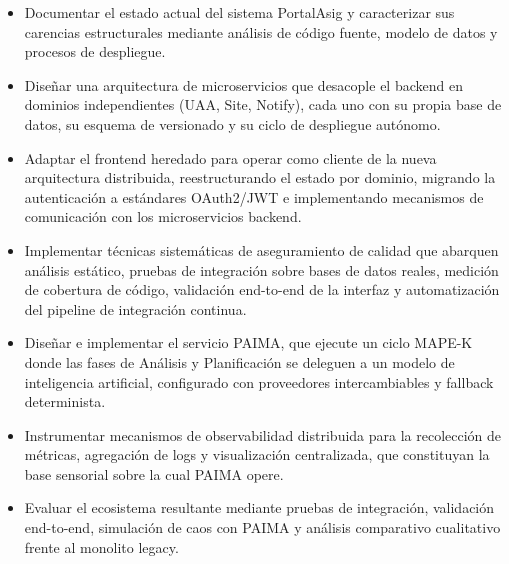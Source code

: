 \begin{itemize}
    \item Documentar el estado actual del sistema PortalAsig y caracterizar sus
carencias estructurales mediante an\'{a}lisis de c\'{o}digo fuente, modelo de datos y
procesos de despliegue.
    \item Dise\~{n}ar una arquitectura de microservicios que desacople el backend en
dominios independientes (UAA, Site, Notify), cada uno con su propia base de datos,
su esquema de versionado y su ciclo de despliegue aut\'{o}nomo.
    \item Adaptar el frontend heredado para operar como cliente de la nueva
arquitectura distribuida, reestructurando el estado por dominio, migrando la
autenticaci\'{o}n a est\'{a}ndares OAuth2/JWT e implementando mecanismos de
comunicaci\'{o}n con los microservicios backend.
    \item Implementar t\'{e}cnicas sistem\'{a}ticas de aseguramiento de calidad que abarquen
an\'{a}lisis est\'{a}tico, pruebas de integraci\'{o}n sobre bases de datos reales, medici\'{o}n de
cobertura de c\'{o}digo, validaci\'{o}n end-to-end de la interfaz y automatizaci\'{o}n del
pipeline de integraci\'{o}n continua.
    \item Dise\~{n}ar e implementar el servicio PAIMA, que ejecute un ciclo MAPE-K
donde las fases de An\'{a}lisis y Planificaci\'{o}n se deleguen a un modelo de inteligencia
artificial, configurado con proveedores intercambiables y fallback determinista.
    \item Instrumentar mecanismos de observabilidad distribuida para la recolecci\'{o}n
de m\'{e}tricas, agregaci\'{o}n de logs y visualizaci\'{o}n centralizada, que constituyan la
base sensorial sobre la cual PAIMA opere.
    \item Evaluar el ecosistema resultante mediante pruebas de integraci\'{o}n,
validaci\'{o}n end-to-end, simulaci\'{o}n de caos con PAIMA y an\'{a}lisis comparativo
cualitativo frente al monolito legacy.
\end{itemize}
